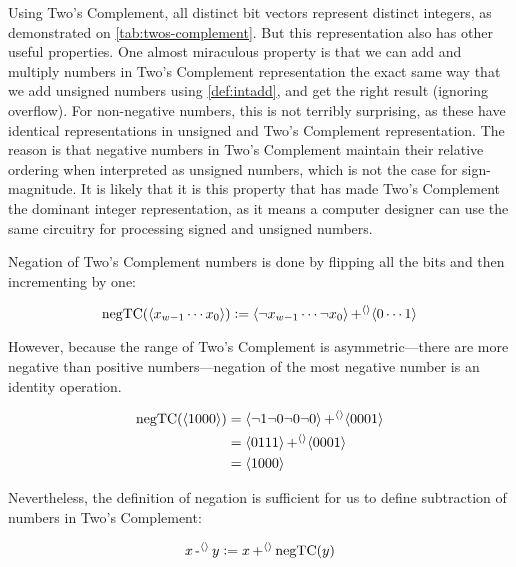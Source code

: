 Using Two's Complement, all distinct bit vectors represent distinct
integers, as demonstrated on \cref{tab:twos-complement}.  But this
representation also has other useful properties.  One almost
miraculous property is that we can add and multiply numbers in Two's
Complement representation the exact same way that we add unsigned
numbers using \cref{def:intadd}, and get the right result (ignoring
overflow).  For non-negative numbers, this is not terribly surprising,
as these have identical representations in unsigned and Two's
Complement representation.  The reason is that negative numbers in
Two's Complement maintain their relative ordering when interpreted as
unsigned numbers, which is not the case for sign-magnitude.  It is
likely that it is this property that has made Two's Complement the
dominant integer representation, as it means a computer designer can
use the same circuitry for processing signed and unsigned numbers.

Negation of Two's Complement numbers is done by flipping all the bits
and then incrementing by one:

\begin{definition}
  \[
    \mathrm{negTC}(\langle x_{w-1}\cdots{}x_{0} \rangle) \vcentcolon= \langle \neg{}x_{w-1}\cdots{}\neg{}x_{0} \rangle \operatorname{+^{\langle\rangle}} \langle 0\cdots{}1 \rangle
  \]
\end{definition}

However, because the range of Two's Complement is asymmetric---there
are more negative than positive numbers---negation of the most
negative number is an identity operation.

\begin{example}
  \begin{align*}
    \mathrm{negTC}(\langle 1000 \rangle)
    &= \langle \neg 1 \neg 0 \neg 0 \neg 0 \rangle \operatorname{+^{\langle\rangle}} \langle 0001 \rangle \\
    &= \langle 0 1 1 1 \rangle \operatorname{+^{\langle\rangle}} \langle 0001 \rangle \\
    &= \langle 1 0 0 0 \rangle \\
  \end{align*}
\end{example}

Nevertheless, the definition of negation is sufficient for us to
define subtraction of numbers in Two's Complement:

\begin{definition}
  \begin{align*}
    x \operatorname{-^{\langle\rangle}} y \vcentcolon= x \operatorname{+^{\langle\rangle}} \mathrm{negTC}(y)
  \end{align*}
  \label{def:intsub}
\end{definition}

